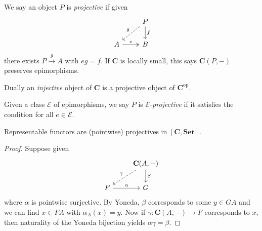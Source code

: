 \documentclass[a4paper]{article}
\renewcommand{\c}[1]{\mathbf{#1}}
\newcommand{\Set}{{\c{Set}}}
\begin{document}
\begin{definition}
  We say an object \(P\) is \emph{projective} if given
  \[
    \begin{tikzcd}
      & P \ar[d, "f"] \ar[dl, "g"', dashed] \\
      A \ar[r, "e", twoheadrightarrow] & B
    \end{tikzcd}
  \]
  there exists \(P \xrightarrow{g} A\) with \(eg = f\). If \(\c C\) is locally small, this says \(\c C(P, -)\) preserves epimorphisms.

  Dually an \emph{injective} object of \(\c C\) is a projective object of \(\c C^{\text{op}}\).

  Given a class \(\mathcal E\) of epimorphisms, we say \(P\) is \emph{\(\mathcal E\)-projective} if it satisfies the condition for all \(e \in \mathcal E\).
\end{definition}

\begin{lemma}
  Representable functors are (pointwise) projectives in \([\c C, \Set]\).
\end{lemma}

\begin{proof}
  Suppose given
  \[
    \begin{tikzcd}
      & \c C(A, -) \ar[d, "\beta"] \ar[dl, "\gamma"', dashed]\\
      F \ar[r, "\alpha"] & G
    \end{tikzcd}
  \]
  where \(\alpha\) is pointwise surjective. By Yoneda, \(\beta\) corresponds to some \(y \in GA\) and we can find \(x \in FA\) with \(\alpha_A(x) = y\). Now if \(\gamma: \c C(A, -) \to F\) corresponds to \(x\), then naturality of the Yoneda bijection yields \(\alpha\gamma = \beta\).
\end{proof}




\printindex
\end{document}
